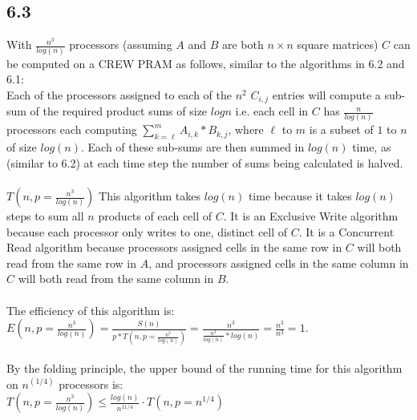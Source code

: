 \documentclass[letterpaper,notitlepage,twoside]{article}
\begin{document}
\subsection*{6.3}
With $\frac{n^3}{log(n)}$ processors (assuming $A$ and $B$ are both $n \times n$ square matrices) $C$ can be computed on a CREW PRAM as follows, similar to the algorithms in 6.2 and 6.1: \\
Each of the processors assigned to each of the $n^2$ $C_{i, j}$ entries will compute a sub-sum of the required product sums of size $log n$ i.e. each cell in $C$ has $\frac{n}{log(n)}$ processors each computing $\sum_{k = \ell}^{m}  A_{i, k} * B_{k, j}$, where $\ell$ to $m$ is a subset of $1$ to $n$ of size $log(n)$. Each of these sub-sums are then summed in $log(n)$ time, as (similar to 6.2) at each time step the number of sums being calculated is halved. \\\\
$T(n, p = \frac{n^3}{log(n)})$ This algorithm takes $log(n)$ time because it takes $log(n)$ steps to sum all $n$ products of each cell of $C$. It is an Exclusive Write algorithm because each processor only writes to one, distinct cell of $C$. It is a Concurrent Read algorithm because processors assigned cells in the same row in $C$ will both read from the same row in $A$, and processors assigned cells in the same column in $C$ will both read from the same column in $B$. \\\\
The efficiency of this algorithm is: $E(n, p = \frac{n^{3}}{log(n)}) = \frac{S(n)}{p * T(n, p = \frac{n^3}{log(n)})} = \frac{n^3}{\frac{n^3}{log(n)} * log(n)} = \frac{n^3}{n^3} = 1$. \\\\
By the folding principle, the upper bound of the running time for this algorithm on $n^(1/4)$ processors is:\\
$T(n, p = \frac{n^{3}}{log(n)}) \leq \frac{log(n)}{n^{11/4}} \cdot T(n, p = n^{1/4})$
\end{document}
